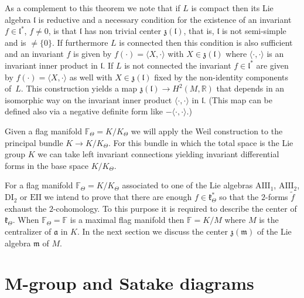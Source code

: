 \documentclass[10pt,a4paper]{amsart}
\numberwithin{equation}{section}
\begin{document}
As a complement to this theorem we note that if $L$ is compact then its Lie algebra $\mathfrak{l}$ is reductive and a necessary condition for the existence of an invariant $f\in \mathfrak{l}^{\ast }$, $f\neq 0$, is that $\mathfrak{l}$ has non trivial center $\mathfrak{z} ( \mathfrak{l})$, that is, $\mathfrak{l}$ is not semi-simple and is $\neq \{0\}$. If furthermore $L$ is connected then this condition is also sufficient and an invariant $f$ is given by $f(\cdot) =\langle X,\cdot \rangle $ with $X\in \mathfrak{z} ( \mathfrak{l} ) $ where $\langle \cdot,\cdot \rangle $ is an invariant inner product in $\mathfrak{l}$. If $L$ is not connected the invariant $f\in \mathfrak{l}^{\ast }$ are given by $f ( \cdot ) =\langle X,\cdot \rangle $ as well with $X\in \mathfrak{z} ( \mathfrak{l} ) $ fixed by the non-identity components of~$L$. This construction yields a map $\mathfrak{z} ( \mathfrak{l} ) \rightarrow H^{2} ( M,\mathbb{R} ) $ that depends in an isomorphic way on the invariant inner product $\langle \cdot,\cdot \rangle $ in $\mathfrak{l}$. (This map can be defined also via a negative definite form like $-\langle \cdot,\cdot \rangle $.)

Given a flag manifold $\mathbb{F}_{\Theta }=K/K_{\Theta }$ we will apply the Weil construction to the principal bundle $K\rightarrow K/K_{\Theta }$. For this bundle in which the total space is the Lie group $K$ we can take left invariant connections yielding invariant differential forms in the base space $K/K_{\Theta }$.

For a flag manifold $\mathbb{F}_{\Theta }=K/K_{\Theta }$ associated to one of the Lie algebras $\mathrm{AIII}_{1}$, $\mathrm{AIII}_{2}$, $\mathrm{DI}_{2}$ or $\mathrm{EII}$ we intend to prove that there are enough $f\in \mathfrak{k}_{\Theta }^{\ast }$ so that the $2$-forms $\widetilde{f}$ exhaust the $2$-cohomology. To this purpose it is required to describe the center of $\mathfrak{k}_{\Theta }$. When $\mathbb{F}_{\Theta }=\mathbb{F}$ is a maximal flag manifold then $\mathbb{F}=K/M$ where $M$ is the centralizer of $\mathfrak{a}$ in $K$. In the next section we discuss the center $\mathfrak{z}(\mathfrak{m}) $ of the Lie algebra $\mathfrak{m}$ of $M$.

\section[$M$-group and Satake diagrams]{$\boldsymbol{M}$-group and Satake diagrams}\label{seccenterM}
\end{document}
